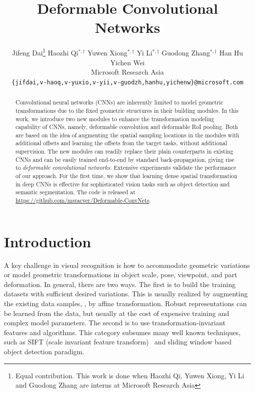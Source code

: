 \documentclass[10pt,twocolumn,letterpaper]{article}
\begin{document}
\title{Deformable Convolutional Networks}

\author{Jifeng Dai\thanks{Equal contribution. \dag This work is done when Haozhi Qi, Yuwen Xiong, Yi Li and Guodong Zhang are interns at Microsoft Research Asia} \quad Haozhi Qi$^{*,\dag}$ \quad Yuwen Xiong$^{*,\dag}$ \quad Yi Li$^{*,\dag}$ \quad Guodong Zhang$^{*,\dag}$ \quad Han Hu \quad Yichen Wei \vspace{8pt}\\
	Microsoft Research Asia\\
	{\tt\small \{jifdai,v-haoq,v-yuxio,v-yii,v-guodzh,hanhu,yichenw\}@microsoft.com}
}

\maketitle


\begin{abstract}

Convolutional neural networks (CNNs) are inherently limited to model geometric transformations due to the fixed geometric structures in their building modules. In this work, we introduce two new modules to enhance the transformation modeling capability of CNNs, namely, deformable convolution and deformable RoI pooling. Both are based on the idea of augmenting the spatial sampling locations in the modules with additional offsets and learning the offsets from the target tasks, without additional supervision. The new modules can readily replace their plain counterparts in existing CNNs and can be easily trained end-to-end by standard back-propagation, giving rise to \emph{deformable convolutional networks}. Extensive experiments validate the performance of our approach. For the first time, we show that learning dense spatial transformation in deep CNNs is effective for sophisticated vision tasks such as object detection and semantic segmentation. The code is released at \url{https://github.com/msracver/Deformable-ConvNets}.

\end{abstract}

\section{Introduction}
\label{sec.introduction}

A key challenge in visual recognition is how to accommodate geometric variations or model geometric transformations in object scale, pose, viewpoint, and part deformation. In general, there are two ways. The first is to build the training datasets with sufficient desired variations. This is usually realized by augmenting the existing data samples, \eg,  by affine transformation. Robust representations can be learned from the data, but usually at the cost of expensive training and complex model parameters. The second is to use transformation-invariant features and algorithms. This category subsumes many well known techniques, such as SIFT (scale invariant feature transform)~\cite{lowe1999object} and sliding window based object detection paradigm.
\end{document}
